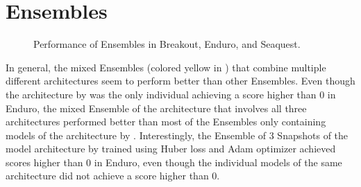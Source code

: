 \section{Ensembles}
\begin{figure}[ht!]
    \centering


    \caption{Performance of Ensembles in Breakout, Enduro, and Seaquest.}
    \label{fig:res:ensembles_only}
\end{figure}

In general, the mixed Ensembles (colored yellow in ) that combine multiple different architectures seem to perform better than other Ensembles. Even though the architecture by \textcite{mnih_playing_2013} was the only individual achieving a score higher than 0 in Enduro, the mixed Ensemble of the architecture that involves all three architectures performed better than most of the Ensembles only containing models of the architecture by \textcite{mnih_playing_2013}. Interestingly, the Ensemble of 3 Snapshots of the model architecture by \textcite{mnih_human-level_2015} trained using Huber loss and Adam optimizer achieved scores higher than 0 in Enduro, even though the individual models of the same architecture did not achieve a score higher than 0.

